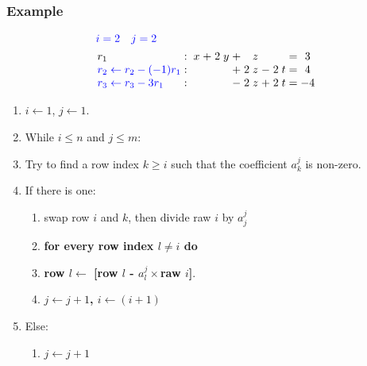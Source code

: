 \documentclass{beamer}
\begin{document}
\begin{frame}
  \frametitle{Example}
  
  \[\arraycolsep=1.4pt
  \begin{aligned}
    &{\color{blue}i = 2 \quad j = 2} \\
      &
    \begin{array}{lcccccccccccccc}
        r_1  & : &  & x & + & 2 & y & + &  & z &  & & & = & 3\\
        {\color{blue}r_2 \leftarrow r_2 - (-1)r_1} & : &   &   &  &  &  & + & 2 & z & - & 2 & t  & = & 4\\
        {\color{blue}r_3 \leftarrow r_3 - 3r_1} & : &  &   &  &  &  & - & 2 & z & + & 2 & t & = & -4\\
    \end{array}
  \end{aligned}
  \]
  
  
  \begin{enumerate}
  \item $i \leftarrow 1$, $j \leftarrow 1$.
  \item While $i \le n$ and $j \le m$:
  \item Try to find a row index $k \ge i$ such that the coefficient $a^j_k$ is non-zero.
  \item If there is one:
    \begin{enumerate}
    \item swap row $i$ and $k$, then divide raw $i$ by $a^{j}_j$
    \item {\bf for every row index $l \neq i$ do} 
    \item {\bf row $l \leftarrow$ [row $l$ - $a^j_l\times$raw $i$]}.
    \item {\bf $j \leftarrow j+1$, $i \leftarrow (i+1)$}
    \end{enumerate}
  \item Else:
    \begin{enumerate}
    \item $j \leftarrow j+1$
    \end{enumerate}
  \end{enumerate}
  
\end{frame}
\end{document}
